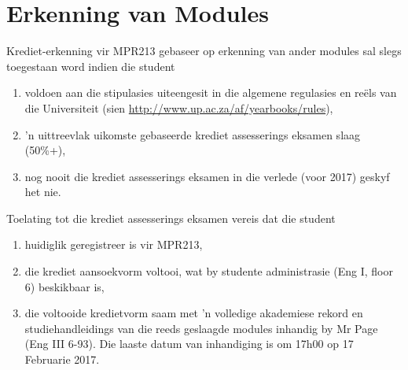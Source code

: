 \newpage
\section{Erkenning van Modules} \label{sec:credit_study_guide}
    \noindent
    Krediet-erkenning vir MPR213 gebaseer op erkenning van ander modules sal
    slegs toegestaan word indien die student
    \begin{enumerate}
        \item voldoen aan die stipulasies uiteengesit in die algemene
            regulasies en re\"els van die Universiteit (sien
            \url{http://www.up.ac.za/af/yearbooks/rules}),
        \item 'n uittreevlak uikomste gebaseerde krediet assesserings eksamen
            slaag (50\%+),
        \item nog nooit die krediet assesserings eksamen in die verlede (voor
            2017) geskyf het nie.
    \end{enumerate}

    \noindent
    Toelating tot die krediet assesserings eksamen vereis dat die student
    \begin{enumerate}
        \item huidiglik geregistreer is vir MPR213,
        \item die krediet aansoekvorm voltooi, wat by studente administrasie
            (Eng I, floor 6) beskikbaar is,
        \item die voltooide kredietvorm saam met 'n volledige akademiese rekord
            en studiehandleidings van die reeds geslaagde modules inhandig by
            Mr Page (Eng III 6-93). Die laaste datum van inhandiging is om
            17h00 op 17 Februarie 2017.
    \end{enumerate}

